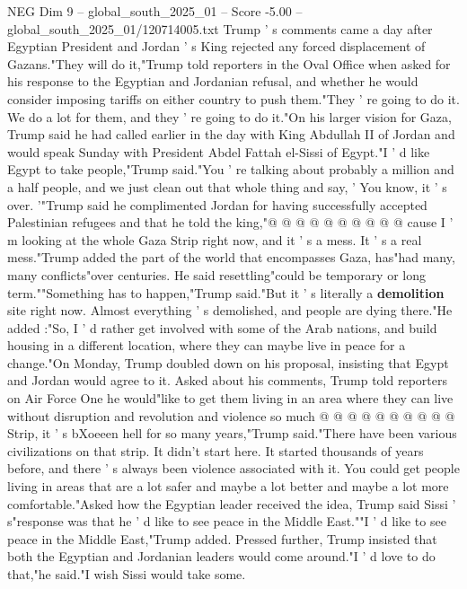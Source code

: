 \begin{textsample}{NEG Dim 9 – global\_south\_2025\_01 – Score -5.00 – global\_south\_2025\_01/120714005.txt}  \label{ex:f9_neg_106}
Trump ' s comments came a day after Egyptian President and Jordan ' s King rejected any forced displacement of Gazans."They will do it,"Trump told reporters in the Oval Office when asked for his response to the Egyptian and Jordanian refusal, and whether he would consider imposing tariffs on either country to push them."They ' re going to do it.
We do a lot for them, and they ' re going to do it."On his larger vision for Gaza, Trump said he had called earlier in the day with King Abdullah II of Jordan and would speak Sunday with President Abdel Fattah el-Sissi of Egypt."I ' d like Egypt to take people,"Trump said."You ' re talking about probably a million and a half people, and we just clean out that whole thing and say, ' You know, it ' s over. '"Trump said he complimented Jordan for having successfully accepted Palestinian refugees and that he told the king,"@ @ @ @ @ @ @ @ @ @ cause I ' m looking at the whole Gaza Strip right now, and it ' s a mess.
It ' s a real mess."Trump added the part of the world that encompasses Gaza, has"had many, many conflicts"over centuries.
He said resettling"could be temporary or long term.""Something has to happen,"Trump said."But it ' s literally a \textbf{demolition} site right now.
Almost everything ' s demolished, and people are dying there."He added :"So, I ' d rather get involved with some of the Arab nations, and build housing in a different location, where they can maybe live in peace for a change."On Monday, Trump doubled down on his proposal, insisting that Egypt and Jordan would agree to it.
Asked about his comments, Trump told reporters on Air Force One he would"like to get them living in an area where they can live without disruption and revolution and violence so much @ @ @ @ @ @ @ @ @ @ Strip, it ' s bXoeeen hell for so many years,"Trump said."There have been various civilizations on that strip.
It didn't start here.
It started thousands of years before, and there ' s always been violence associated with it.
You could get people living in areas that are a lot safer and maybe a lot better and maybe a lot more comfortable."Asked how the Egyptian leader received the idea, Trump said Sissi ' s"response was that he ' d like to see peace in the Middle East.""I ' d like to see peace in the Middle East,"Trump added.
Pressed further, Trump insisted that both the Egyptian and Jordanian leaders would come around."I ' d love to do that,"he said."I wish Sissi would take some.

\end{textsample}
